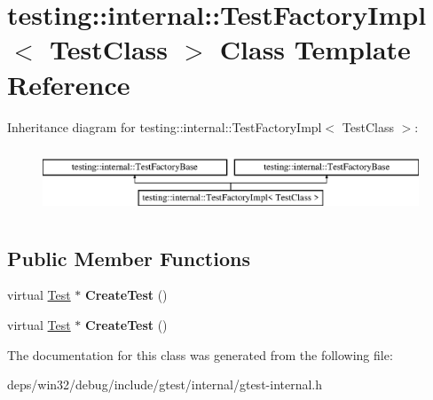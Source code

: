 \hypertarget{classtesting_1_1internal_1_1_test_factory_impl}{}\section{testing\+:\+:internal\+:\+:Test\+Factory\+Impl$<$ Test\+Class $>$ Class Template Reference}
\label{classtesting_1_1internal_1_1_test_factory_impl}
Inheritance diagram for testing\+:\+:internal\+:\+:Test\+Factory\+Impl$<$ Test\+Class $>$\+:\begin{figure}[H]
\begin{center}
\leavevmode
\includegraphics[height=2.000000cm]{classtesting_1_1internal_1_1_test_factory_impl}
\end{center}
\end{figure}
\subsection*{Public Member Functions}
\begin{DoxyCompactItemize}
\item 
\hypertarget{classtesting_1_1internal_1_1_test_factory_impl_a8860c89bdb06450a5d5e8137ebd9d775}{}virtual \hyperlink{classtesting_1_1_test}{Test} $\ast$ {\bfseries Create\+Test} ()\label{classtesting_1_1internal_1_1_test_factory_impl_a8860c89bdb06450a5d5e8137ebd9d775}

\item 
\hypertarget{classtesting_1_1internal_1_1_test_factory_impl_a8860c89bdb06450a5d5e8137ebd9d775}{}virtual \hyperlink{classtesting_1_1_test}{Test} $\ast$ {\bfseries Create\+Test} ()\label{classtesting_1_1internal_1_1_test_factory_impl_a8860c89bdb06450a5d5e8137ebd9d775}

\end{DoxyCompactItemize}


The documentation for this class was generated from the following file\+:\begin{DoxyCompactItemize}
\item 
deps/win32/debug/include/gtest/internal/gtest-\/internal.\+h\end{DoxyCompactItemize}
